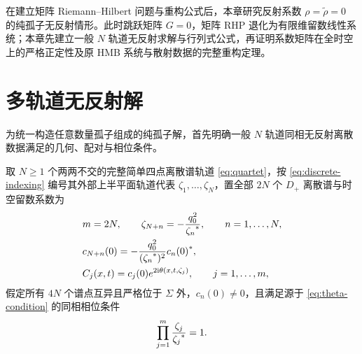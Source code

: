 
在建立矩阵 Riemann--Hilbert 问题与重构公式后，本章研究反射系数 $\rho=\widetilde\rho=0$ 的纯孤子无反射情形。此时跳跃矩阵 $G=0$，矩阵 RHP 退化为有限维留数线性系统；本章先建立一般 $N$ 轨道无反射求解与行列式公式，再证明系数矩阵在全时空上的严格正定性及原 HMB 系统与散射数据的完整重构定理。

\section{多轨道无反射解}

为统一构造任意数量孤子组成的纯孤子解，首先明确一般 $N$ 轨道同相无反射离散数据满足的几何、配对与相位条件。

\begin{definition}\label{def:orbit-data}
取 $N\ge1$ 个两两不交的完整简单四点离散谱轨道 \eqref{eq:quartet}，按 \eqref{eq:discrete-indexing} 编号其外部上半平面轨道代表 $\zeta_1,\ldots,\zeta_N$，置全部 $2N$ 个 $D_+$ 离散谱与时空留数系数为
\begin{equation}\label{eq:N-orbit-data}
\begin{aligned}
&m=2N,\qquad \zeta_{N+n}=-\dfrac{q_0^2}{{\zeta_n}^{*}},\qquad n=1,\ldots,N,\\
&c_{N+n}(0)=-\dfrac{q_0^2}{({\zeta_n}^{*})^2}{c_n(0)}^{*},\\
&C_j(x,t)=c_j(0)e^{2\mathrm{i}\theta(x,t,\zeta_j)},\qquad j=1,\ldots,m,
\end{aligned}
\end{equation}
假定所有 $4N$ 个谱点互异且严格位于 $\Sigma$ 外，$c_n(0)\ne0$，且满足源于 \eqref{eq:theta-condition} 的同相相位条件
\begin{equation}\label{eq:N-orbit-phase}
\prod\limits_{j=1}^{m}\dfrac{\zeta_j}{{\zeta_j}^{*}}=1.
\end{equation}
\end{definition}

